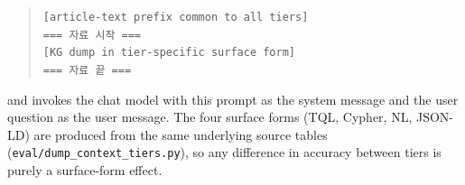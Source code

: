 \begin{quote}\small
\texttt{[article-text prefix common to all tiers]} \\[2pt]
\texttt{=== 자료 시작 ===} \\
\texttt{[KG dump in tier-specific surface form]} \\
\texttt{=== 자료 끝 ===}
\end{quote}

and invokes the chat model with this prompt as the system message and
the user question as the user message. The four surface forms (TQL,
Cypher, NL, JSON-LD) are produced from the same underlying source
tables (\texttt{eval/dump\_context\_tiers.py}), so any difference in
accuracy between tiers is purely a surface-form effect.
